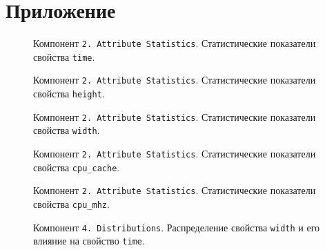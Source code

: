 \section*{Приложение}
%

\begin{figure}[H]
    \caption{Компонент \texttt{2. Attribute Statistics}. Статистические показатели свойства \texttt{time}.}
    \label{img:2-Attribute-Statistics-time}
\end{figure}

\begin{figure}[H]
    \caption{Компонент \texttt{2. Attribute Statistics}. Статистические показатели свойства \texttt{height}.}
    \label{img:2-Attribute-Statistics-height}
\end{figure}

\begin{figure}[H]
    \caption{Компонент \texttt{2. Attribute Statistics}. Статистические показатели свойства \texttt{width}.}
    \label{img:2-Attribute-Statistics-width}
\end{figure}

\begin{figure}[H]
    \caption{Компонент \texttt{2. Attribute Statistics}. Статистические показатели свойства \texttt{cpu_cache}.}
    \label{img:2-Attribute-Statistics-cpu_cache}
\end{figure}

\begin{figure}[H]
    \caption{Компонент \texttt{2. Attribute Statistics}. Статистические показатели свойства \texttt{cpu_mhz}.}
    \label{img:2-Attribute-Statistics-cpu_mhz}
\end{figure}

\begin{figure}[H]
    \caption{Компонент \texttt{4. Distributions}. Распределение свойства \texttt{width} и его влияние на свойство \texttt{time}.}
    \label{img:4-Distributions-width}
\end{figure}


